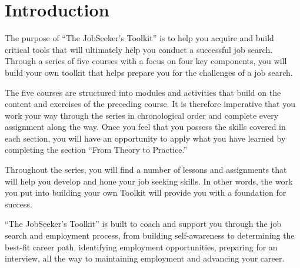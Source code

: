 \hypertarget{intro}{}\chapter*{Introduction}\label{intro}
\renewcommand{\cftchapleader}{\cftdotfill{\cftdotsep}}
\leftskip=0.5cm
\pagestyle{fancyplain}
\fancyfoot[C]{\thepage}
\noindent\makebox[\textwidth]{\rule{\linewidth}{0.4pt}}
The purpose of ``The JobSeeker's Toolkit'' is to help you acquire and build critical tools that will ultimately help you conduct a successful job search. Through a series of five courses with a focus on four key components, you will build your own toolkit that helps prepare you for the challenges of a job search.

The five courses are structured into modules and activities that build on the content and exercises of the preceding course. It is therefore imperative that you work your way through the series in chronological order and complete every assignment along the way. Once you feel that you possess the skills covered in each section, you will have an opportunity to apply what you have learned by completing the section ``From Theory to Practice.''

Throughout the series, you will find a number of lessons and assignments that will help you develop and hone your job seeking skills. In other words, the work you put into building your own Toolkit will provide you with a foundation for success.

``The JobSeeker's Toolkit'' is built to coach and support you through the job search and employment process, from building self-awareness to determining the best-fit career path, identifying employment opportunities, preparing for an interview, all the way to maintaining employment and advancing your career.

